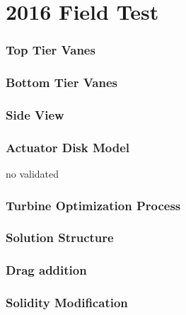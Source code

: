 \documentclass[mathserif]{beamer}
\begin{document}

\section{2016 Field Test}
%
%
\begin{frame}
 \frametitle{Top Tier Vanes}



\end{frame}



%
%
\begin{frame}
 \frametitle{Bottom Tier Vanes}



\end{frame}



%
%
\begin{frame}
 \frametitle{Side View}



\end{frame}


%
%
\begin{frame}
 \frametitle{Actuator Disk Model}

 no validated

\end{frame}


%
%
\begin{frame}
 \frametitle{Turbine Optimization Process}



\end{frame}


%
%
\begin{frame}
 \frametitle{Solution Structure}



\end{frame}



%
%
\begin{frame}
 \frametitle{Drag addition}



\end{frame}



%
%
\begin{frame}
 \frametitle{Solidity Modification}



\end{frame}
\end{document}
